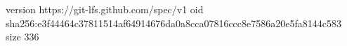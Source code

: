 version https://git-lfs.github.com/spec/v1
oid sha256:e3f44464c37811514af64914676da0a8cca07816ccc8e7586a20e5fa8144c583
size 336
